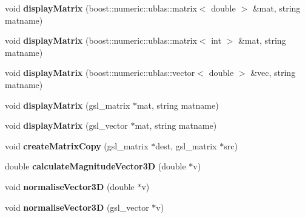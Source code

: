 \begin{DoxyCompactItemize}
\item 
\hypertarget{classShapeBase_a488d30bfef98b1f1786d8d2b8ec17b99}{}void {\bfseries display\+Matrix} (boost\+::numeric\+::ublas\+::matrix$<$ double $>$ \&mat, string matname)\label{classShapeBase_a488d30bfef98b1f1786d8d2b8ec17b99}

\item 
\hypertarget{classShapeBase_a32973247ffcf77c2fd03f5d00c9fda42}{}void {\bfseries display\+Matrix} (boost\+::numeric\+::ublas\+::matrix$<$ int $>$ \&mat, string matname)\label{classShapeBase_a32973247ffcf77c2fd03f5d00c9fda42}

\item 
\hypertarget{classShapeBase_ae121abd34a8206b1f6e6829987ddf5c6}{}void {\bfseries display\+Matrix} (boost\+::numeric\+::ublas\+::vector$<$ double $>$ \&vec, string matname)\label{classShapeBase_ae121abd34a8206b1f6e6829987ddf5c6}

\item 
\hypertarget{classShapeBase_a51b06b089203d187455c97065ad57499}{}void {\bfseries display\+Matrix} (gsl\+\_\+matrix $\ast$mat, string matname)\label{classShapeBase_a51b06b089203d187455c97065ad57499}

\item 
\hypertarget{classShapeBase_af9a10295e67e1f9047d0800ec6b30b0c}{}void {\bfseries display\+Matrix} (gsl\+\_\+vector $\ast$mat, string matname)\label{classShapeBase_af9a10295e67e1f9047d0800ec6b30b0c}

\item 
\hypertarget{classShapeBase_a4b37ec963a6078a7e03512d23470c257}{}void {\bfseries create\+Matrix\+Copy} (gsl\+\_\+matrix $\ast$dest, gsl\+\_\+matrix $\ast$src)\label{classShapeBase_a4b37ec963a6078a7e03512d23470c257}

\item 
\hypertarget{classShapeBase_ac5d2cfe341eceb73f39d90955356f7b8}{}double {\bfseries calculate\+Magnitude\+Vector3\+D} (double $\ast$v)\label{classShapeBase_ac5d2cfe341eceb73f39d90955356f7b8}

\item 
\hypertarget{classShapeBase_afebf3d9e96e28e5272884f09b61eaab3}{}void {\bfseries normalise\+Vector3\+D} (double $\ast$v)\label{classShapeBase_afebf3d9e96e28e5272884f09b61eaab3}

\item 
\hypertarget{classShapeBase_a9e7ca6bbc30107ed82e73694f9c34717}{}void {\bfseries normalise\+Vector3\+D} (gsl\+\_\+vector $\ast$v)\label{classShapeBase_a9e7ca6bbc30107ed82e73694f9c34717}


\end{DoxyCompactItemize}
